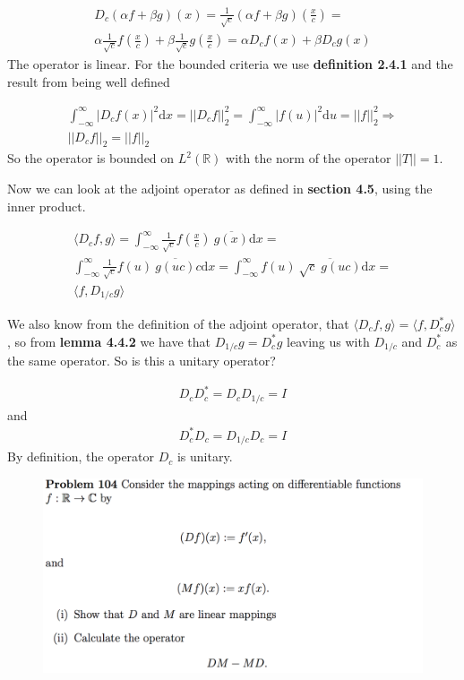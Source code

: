 \documentclass{article}
\begin{document}
\begin{gather*}
    D_c(\alpha f + \beta g)(x) = \frac{1}{\sqrt{c}}(\alpha f + \beta g)(\frac{x}{c}) = \\
    \alpha \frac{1}{\sqrt{c}} f (\frac{x}{c})+ \beta \frac{1}{\sqrt{c}} g (\frac{x}{c}) = \alpha D_c f(x) + \beta D_c g(x) 
\end{gather*}
The operator is linear. For the bounded criteria we use \textbf{definition 2.4.1} and the result from being well defined

\begin{gather*}
    \int_{-\infty}^{\infty} |D_c f(x)|^2 \text{d}x = || D_cf||_2^2 = \int_{-\infty}^{\infty} \left|f(u)\right|^2 \text{d}u = ||f||_2^2 \Rightarrow \\
    ||D_cf||_2 = ||f||_2
\end{gather*}
So the operator is bounded on $L^2(\mathbb{R})$ with the norm of the operator $||T|| = 1$. 

Now we can look at the adjoint operator as defined in \textbf{section 4.5}, using the inner product. 

\begin{gather*}
    \langle D_cf , g \rangle = \int_{-\infty}^{\infty} \frac{1}{\sqrt{c}}f(\frac{x}{c})\: \overline{g(x)} \text{d}x = \\
    \int_{-\infty}^{\infty} \frac{1}{\sqrt{c}}f(u)\: \overline{g(u c)} c \text{d}x = \int_{-\infty}^{\infty} f(u)\: \overline{ \sqrt{c} \;g(u c)} \text{d}x = \\
    \langle f, D_{1/c} g \rangle
\end{gather*}

We also know from the definition of the adjoint operator, that $\langle D_cf, g \rangle = \langle f, D_c^* g \rangle$, so from \textbf{lemma 4.4.2} we have that $D_{1/c} g =D_c^* g$ leaving us with $D_{1/c}$ and $D_c^*$ as the same operator. So is this a unitary operator?

\begin{gather*}
    D_c D_c^* = D_c D_{1/c}  = I
\end{gather*}
and
\begin{gather*}
     D_c^*D_c = D_{1/c}D_c   = I
\end{gather*}
    By definition, the operator $D_c$ is unitary. 
    
    
    
\begin{figure}[H]
    \centering
    \includegraphics[width=\textwidth]{fig/opg104}
\end{figure}
\end{document}
